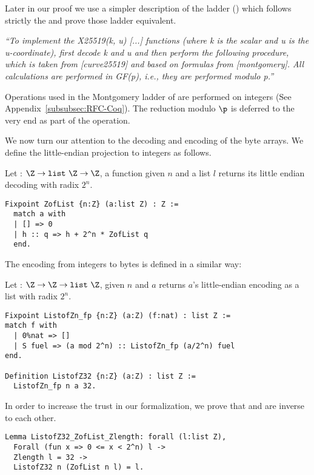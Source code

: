 Later in our proof we use a simpler description of the ladder
() which follows strictly the 
and prove those ladder equivalent.

\emph{``To implement the X25519(k, u) [...] functions (where k is
  the scalar and u is the u-coordinate), first decode k and u and then
  perform the following procedure, which is taken from [curve25519] and
  based on formulas from [montgomery].  All calculations are performed
  in GF(p), i.e., they are performed modulo p.''}~\cite{rfc7748}

Operations used in the Montgomery ladder of  are performed on
integers (See Appendix~\ref{subsubsec:RFC-Coq}).
The reduction modulo $\p$ is deferred to the very end as part of the
 operation.

We now turn our attention to the decoding and encoding of the byte arrays.
We define the little-endian projection to integers as follows.
\begin{dfn}
  Let  : $\Z \rightarrow \texttt{list}~\Z \rightarrow \Z$,
  a function given $n$ and a list $l$ returns its little endian decoding with radix $2^n$.
\end{dfn}
\begin{lstlisting}[language=Coq,aboveskip=0pt,belowskip=1pt]
Fixpoint ZofList {n:Z} (a:list Z) : Z :=
  match a with
  | [] => 0
  | h :: q => h + 2^n * ZofList q
  end.
\end{lstlisting}
The encoding from integers to bytes is defined in a similar way:
\begin{dfn}
  Let  : $\Z \rightarrow \Z \rightarrow \texttt{list}~\Z$, given
  $n$ and $a$ returns $a$'s little-endian encoding as a list with radix $2^n$.
\end{dfn}
\begin{lstlisting}[language=Coq,aboveskip=0pt,belowskip=1pt]
Fixpoint ListofZn_fp {n:Z} (a:Z) (f:nat) : list Z :=
match f with
  | 0%nat => []
  | S fuel => (a mod 2^n) :: ListofZn_fp (a/2^n) fuel
end.

Definition ListofZ32 {n:Z} (a:Z) : list Z :=
  ListofZn_fp n a 32.
\end{lstlisting}
In order to increase the trust in our formalization, we prove that
 and  are inverse to each other.
\begin{lstlisting}[language=Coq,aboveskip=0pt,belowskip=1pt]
Lemma ListofZ32_ZofList_Zlength: forall (l:list Z),
  Forall (fun x => 0 <= x < 2^n) l ->
  Zlength l = 32 ->
  ListofZ32 n (ZofList n l) = l.
\end{lstlisting}

